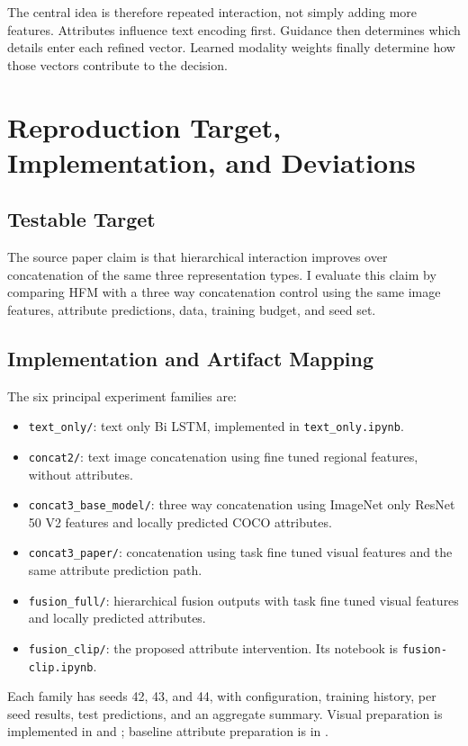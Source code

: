 \documentclass[conference]{IEEEtran}
\begin{document}
The central idea is therefore repeated interaction, not simply adding more features. Attributes influence text encoding first. Guidance then determines which details enter each refined vector. Learned modality weights finally determine how those vectors contribute to the decision.

\section{Reproduction Target, Implementation, and Deviations}
\label{sec:reproduction}
\subsection{Testable Target}
The source paper claim is that hierarchical interaction improves over concatenation of the same three representation types. I evaluate this claim by comparing HFM with a three way concatenation control using the same image features, attribute predictions, data, training budget, and seed set.

\subsection{Implementation and Artifact Mapping}
The six principal experiment families are:
\begin{itemize}
\item \texttt{text\_only/}: text only Bi LSTM, implemented in \texttt{text\_only.ipynb}.
\item \texttt{concat2/}: text image concatenation using fine tuned regional features, without attributes.
\item \texttt{concat3\_base\_model/}: three way concatenation using ImageNet only ResNet 50 V2 features and locally predicted COCO attributes.
\item \texttt{concat3\_paper/}: concatenation using task fine tuned visual features and the same attribute prediction path.
\item \texttt{fusion\_full/}: hierarchical fusion outputs with task fine tuned visual features and locally predicted attributes.
\item \texttt{fusion\_clip/}: the proposed attribute intervention. Its notebook is \texttt{fusion-clip.ipynb}.
\end{itemize}
Each family has seeds 42, 43, and 44, with configuration, training history, per seed results, test predictions, and an aggregate summary. Visual preparation is implemented in  and ; baseline attribute preparation is in .
\end{document}

